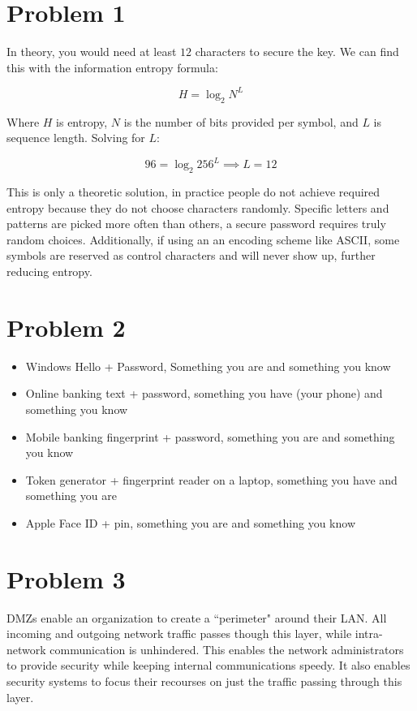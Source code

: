 \documentclass{article}
\newenvironment{problem}[1]{
  \nobreak\section*{Problem #1}
}{}
\begin{document}
  \begin{problem}{1}
    In theory, you would need at least $12$ characters to secure the
    key.  We can find this with the information entropy formula:
    \begin{center}
      \begin{displaymath}
        H = \log_2 N^L
      \end{displaymath}
    \end{center}
    Where $H$ is entropy, $N$ is the number of bits provided per
    symbol, and $L$ is sequence length.  Solving for $L$:
    \begin{center}
      \begin{displaymath}
        96 = \log_2 256^L \implies L = 12 
      \end{displaymath}
    \end{center}
    This is only a theoretic solution, in practice people do not
    achieve required entropy because they do not choose characters
    randomly.  Specific letters and patterns are picked more often
    than others, a secure password requires truly random choices.
    Additionally, if using an an encoding scheme like ASCII, some
    symbols are reserved as control characters and will never show
    up, further reducing entropy.
  \end{problem}

  \begin{problem}{2}
    \begin{itemize}
      \item Windows Hello + Password, Something you are and something you know
      \item Online banking text + password, something you have (your phone) and something you know
      \item Mobile banking fingerprint + password, something you are and something you know
      \item Token generator + fingerprint reader on a laptop, something you have and something you are
      \item Apple Face ID + pin, something you are and something you know
    \end{itemize}
  \end{problem}

  \begin{problem}{3}
    DMZs enable an organization to create a ``perimeter" around their
    LAN.  All incoming and outgoing network traffic passes though
    this layer, while intra-network communication is unhindered.
    This enables the network administrators to provide security while
    keeping internal communications speedy.  It also enables security
    systems to focus their recourses on just the traffic passing
    through this layer.
  \end{problem}
\end{document}
